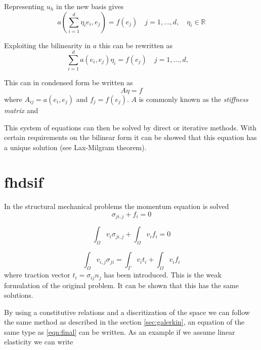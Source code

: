 \documentclass[fem.tex]{subfiles}
\begin{document}
Representing $u_h$ in the new basis gives
\begin{equation} 
    a \left(\sum_{i=1}^d \eta_i e_i, e_j\right) = f(e_j) \quad j = 1, \ldots, d, \quad \eta_i \in \mathbb{R}
    \label{eqn:u_new_base}
\end{equation}

Exploiting the bilinearity in $a$ this can be rewritten as 
\begin{equation} 
    \sum_{i=1}^d a \left( e_i, e_j\right)\eta_i = f(e_j) \quad j = 1, \ldots, d, \quad 
    \label{eqn:final}
\end{equation}

This can in condensed form be written as
\begin{equation} 
    A \eta = f
    \label{eqn:cond}
\end{equation}
where $A_{ij} = a(e_i, e_j)$ and $f_j = f(e_j)$. $A$ is commonly known as the \textit{stiffness matrix} and 

This system of equations can then be solved by direct or iterative methods. With certain requirements on the bilinear form it can be showed that this equation has a unique solution (see Lax-Milgram theorem).


\section{fhdsif}
In the structural mechanical problems the momentum equation is solved
%
\begin{equation} 
   \sigma_{ji,j} + f_i = 0
    \label{eqn:cond}
\end{equation}
%

%
\begin{equation} 
  \int_\Omega  v_i\sigma_{ji,j} + \int_\Omega v_i f_i = 0
    \label{eqn:cond}
\end{equation}
%

%
\begin{equation} 
  \int_\Omega  v_{i,j} \sigma_{ji}  = \int_\Gamma v_i t_i + \int_\Omega v_i f_i
    \label{eqn:weak}
\end{equation}
%
where traction vector $t_i = \sigma_{ij}n_j$ has been introduced. This is the weak formulation of the original problem. It can be shown that this has the same solutions.

By using a constitutive relations and a discritization of the space we can follow the same method as described in the section \ref{sec:galerkin}, an equation of the same type as  \ref{eqn:final} can be written. As an example if we assume linear elasticity we can write
\end{document}
